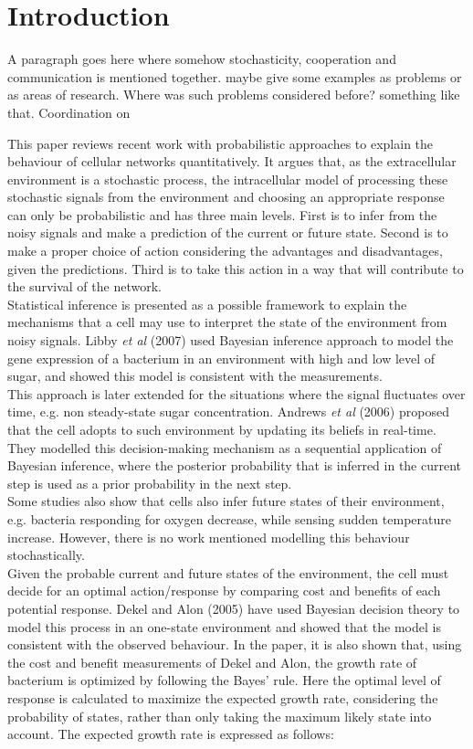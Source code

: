 \chapter{Introduction}
A paragraph goes here where somehow stochasticity, cooperation and communication is mentioned together. maybe give some examples as problems or as areas of research. Where was such problems considered before? something like that.
Coordination on 

This paper reviews recent work with probabilistic approaches to explain the behaviour of cellular networks quantitatively. It argues that, as the extracellular environment is a stochastic process, the intracellular model of processing these stochastic signals from the environment and choosing an appropriate response can only be probabilistic and has three main levels. First is to infer from the noisy signals and make a prediction of the current or future state. Second is to make a proper choice of action considering the advantages and disadvantages, given the predictions. Third is to take this action in a way that will contribute to the survival of the network.\\
Statistical inference is presented as a possible framework to explain the mechanisms that a cell may use to interpret the state of the environment from noisy signals. Libby \textit{et al} (2007) used Bayesian inference approach to model the gene expression of a bacterium in an environment with high and low level of sugar, and showed this model is consistent with the measurements.\\
This approach is later extended for the situations where the signal fluctuates over time, e.g. non steady-state sugar concentration. Andrews \textit{et al} (2006) proposed that the cell adopts to such environment by updating its beliefs in real-time. They modelled this decision-making mechanism as a sequential application of Bayesian inference, where the posterior probability that is inferred in the current step is used as a prior probability in the next step.\\
Some studies also show that cells also infer future states of their environment, e.g. bacteria responding for oxygen decrease, while sensing sudden temperature increase. However, there is no work mentioned modelling this behaviour stochastically.\\
Given the probable current and future states of the environment, the cell must decide for an optimal action/response by comparing cost and benefits of each potential response. Dekel and Alon (2005) have used Bayesian decision theory to model this process in an one-state environment and showed that the model is consistent with the observed behaviour. In the paper, it is also shown that, using the cost and benefit measurements of Dekel and Alon, the growth rate of bacterium is optimized by following the Bayes' rule. Here the optimal level of response is calculated to maximize the expected growth rate, considering the probability of states, rather than only taking the maximum likely state into account. The expected growth rate is expressed as follows:
